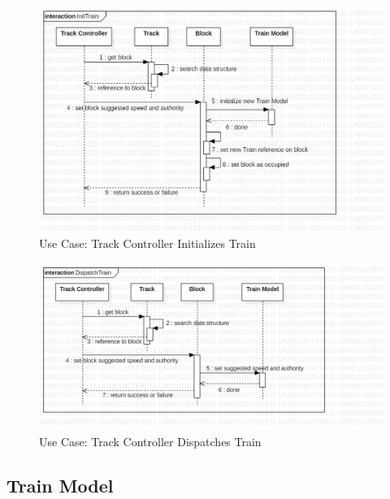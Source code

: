 \documentclass{article}
\begin{document}
    \begin{figure}[H]
        \centering
        \includegraphics[width=\textwidth]{./SequenceDiagrams/TrackModel_SeqDiagrams/TrackModel_SeqDiagram_InitTrain.png}
        \caption{Use Case: Track Controller Initializes Train}
        \label{fig:Track Controller Initializes Train}
    \end{figure}
    \begin{figure}[H]
        \centering
        \includegraphics[width=\textwidth]{./SequenceDiagrams/TrackModel_SeqDiagrams/TrackModel_SeqDiagram_DispatchTrain.png}
        \caption{Use Case: Track Controller Dispatches Train}
        \label{fig:TrackSon}
    \end{figure}
    

    \subsection{Train Model}
    
\end{document}
